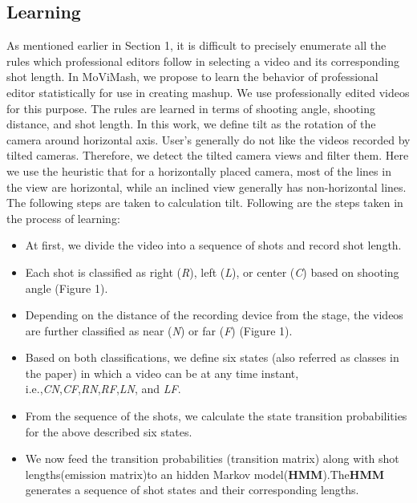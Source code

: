 \documentclass{sig-alternate}
\begin{document}
\subsection{Learning}
As mentioned earlier in Section 1, it is difficult to precisely enumerate all the rules which professional editors follow in selecting a video and its corresponding shot length. In MoViMash, we propose to learn the behavior of professional editor statistically for use in creating mashup. We use professionally edited videos for this purpose. The rules are learned in terms of shooting angle, shooting distance, and shot length. In this work, we define tilt as the rotation of the camera around horizontal axis. User's generally do not like the videos recorded by tilted cameras. Therefore, we detect the tilted camera views and filter them. Here we use the heuristic that for a horizontally placed camera, most of the lines in the view are horizontal, while an inclined view generally has non-horizontal lines. The following steps are taken to calculation tilt. Following are the steps taken in the process of learning:
\begin{itemize}
\item At first, we divide the video into a sequence of shots and record shot length. 
\item Each shot is classified as right (\textsf{\textit{R}}), left (\textsf{\textit{L}}), or center (\textsf{\textit{C}}) based on shooting angle (Figure 1). 
\item Depending on the distance of the recording device from the stage, the videos are further classiﬁed as near (\textsf{\textit{N}}) or far (\textsf{\textit{F}}) (Figure 1). 
\item Based on both classifications, we define six states (also referred as classes in the paper) in which a video can be at any time instant, i.e.,\textsf{\textit{CN}},\textsf{\textit{CF}},\textsf{\textit{RN}},\textsf{\textit{RF}},\textsf{\textit{LN}}, and \textsf{\textit{LF}}. 
\item From the sequence of the shots, we calculate the state transition probabilities for the above described six states. 
\item We now feed the transition probabilities (transition matrix) along with shot lengths(emission matrix)to an hidden Markov model(\textbf{HMM}).The\textbf{HMM} generates a sequence of shot states and their corresponding lengths.

\end{itemize}
\end{document}
